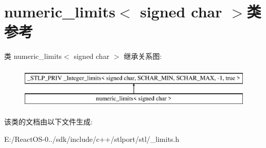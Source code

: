 \hypertarget{classnumeric__limits_3_01signed_01char_01_4}{}\section{numeric\+\_\+limits$<$ signed char $>$类 参考}
\label{classnumeric__limits_3_01signed_01char_01_4}
类 numeric\+\_\+limits$<$ signed char $>$ 继承关系图\+:\begin{figure}[H]
\begin{center}
\leavevmode
\includegraphics[height=2.000000cm]{classnumeric__limits_3_01signed_01char_01_4}
\end{center}
\end{figure}


该类的文档由以下文件生成\+:\begin{DoxyCompactItemize}
\item 
E\+:/\+React\+O\+S-\/0../sdk/include/c++/stlport/stl/\+\_\+limits.\+h\end{DoxyCompactItemize}
